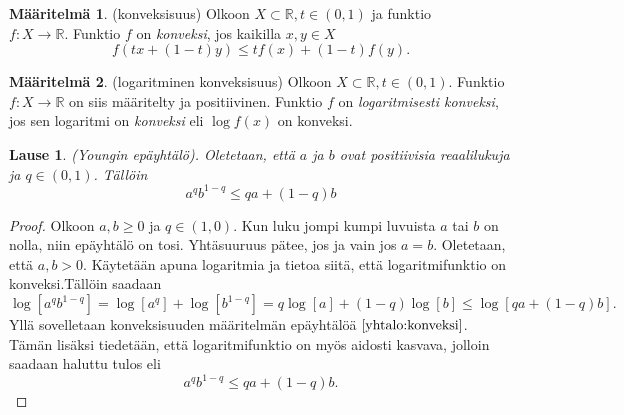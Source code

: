 \documentclass[12pt]{article}
\theoremstyle{definition}
\newtheorem{maar}{Määritelmä}
\theoremstyle{plain}
\newtheorem{lause}{Lause}
\numberwithin{equation}{section}
\begin{document}
\begin{maar}
(konveksisuus) \label{maar: konveksisuus}
Olkoon $X\subset\mathbb{R}, t\in (0, 1)$ ja funktio \\ $f: X \rightarrow \mathbb{R}$. Funktio $f$ on \emph{konveksi}, jos kaikilla $x,y \in X$
\begin{equation}\label{yhtalo:konveksi}
    f(tx+(1-t)y) \le tf(x)+(1-t)f(y).
\end{equation}
\end{maar}


\begin{maar}
(logaritminen konveksisuus) \label{maar: logkonveksisuus}
Olkoon $X\subset\mathbb{R}, t \in (0, 1)$. Funktio $f: X \rightarrow \mathbb{R}$ on siis määritelty ja positiivinen. Funktio $f$ on \emph{logaritmisesti konveksi}, jos sen logaritmi on \emph{konveksi} eli $\log f(x)$ on konveksi.
\end{maar}

\begin{lause} \label{lause: young}
(Youngin epäyhtälö). Oletetaan, että $a$ ja $b$ ovat positiivisia reaalilukuja ja $q \in (0,1)$. Tällöin
\begin{equation}\label{yhtalo:youngi}
    a^{q}b^{1-q} \le qa+(1-q)b
\end{equation}
\end{lause}
\begin{proof}
Olkoon $a,b \ge 0$ ja $q \in (1,0)$. Kun luku jompi kumpi luvuista $a$ tai $b$ on nolla, niin epäyhtälö on tosi. Yhtäsuuruus pätee, jos ja vain jos $a=b$. Oletetaan, että $a,b > 0$. Käytetään apuna logaritmia ja tietoa siitä, että logaritmifunktio on konveksi.Tällöin saadaan
\begin{equation*}
    \log[a^{q}b^{1-q}] = \log[a^q] + \log[b^{1-q}] = q \log [a]+(1-q)\log [b] \le \log[qa+(1-q)b].
\end{equation*}
Yllä sovelletaan konveksisuuden määritelmän epäyhtälöä $\eqref{yhtalo:konveksi}$. Tämän lisäksi tiedetään, että logaritmifunktio on myös aidosti kasvava, jolloin saadaan haluttu tulos eli
\begin{equation*}
    a^{q}b^{1-q}\le qa+(1-q)b.
\end{equation*}
\end{proof}
\end{document}
